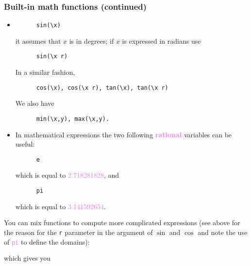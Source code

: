 %
%
\begin{frame}[fragile]
  \frametitle{
    Built-in math functions (continued)
}

  \begin{itemize}
  \item
    \begin{lstlisting}
      sin(\x)
    \end{lstlisting}

    it assumes that $x$ is in degrees; if $x$ is expressed in radians use

    \begin{lstlisting}
      sin(\x r)
    \end{lstlisting}

    In a similar fashion,
    
    \begin{lstlisting}
      cos(\x), cos(\x r), tan(\x), tan(\x r)
    \end{lstlisting}

    We also have

    \begin{lstlisting}
      min(\x,y), max(\x,y).
    \end{lstlisting}
    
  \item 
    In mathematical expressions the two following \textcolor{violet}{\bf rational} variables can be useful:

    \begin{lstlisting}
      e
    \end{lstlisting}
    
    which is equal to \textcolor{violet}{2.718281828}, and

    \begin{lstlisting}
      pi
    \end{lstlisting}

    which is equal to \textcolor{violet}{3.141592654}.

  \end{itemize}
\end{frame}

%
%
\begin{frame}[fragile]
  
  You can mix functions to compute more complicated expressions (see above for the reason for the {\tt r} parameter in the argument of $\sin$ and $\cos$ and note the use of \textcolor{violet}{\tt pi} to define the domains):
  

  which gives you

  \begin{center}
    
  \end{center}

\end{frame}
